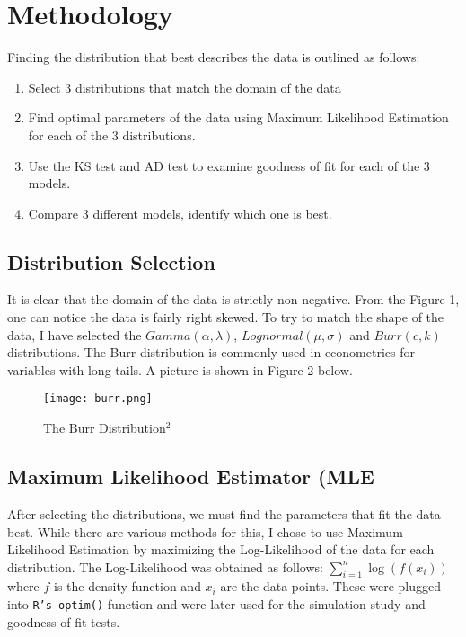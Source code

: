 \documentclass[letterpaper,12pt]{article}
\begin{document}
\section{Methodology}
Finding the distribution that best describes the data is outlined as follows:
\begin{enumerate}
    \item Select 3 distributions that match the domain of the data
    \item Find optimal parameters of the data using Maximum Likelihood Estimation for each of the 3 distributions. 
    \item Use the KS test and AD test to examine goodness of fit for each of the 3 models. 
    \item Compare 3 different models, identify which one is best. 
\end{enumerate}
\subsection{Distribution Selection}

It is clear that the domain of the data is strictly non-negative. From the Figure 1, one can notice the data is fairly right skewed. To try to match the shape of the data, I have selected the $Gamma(\alpha, \lambda)$, $Lognormal(\mu,\sigma)$ and $Burr(c,k)$ distributions. The Burr distribution is commonly used in econometrics for variables with long tails. A picture is shown in Figure 2 below.

\begin{figure}[H]
    \centering
    \caption{The Burr Distribution$^2$}
    \texttt{[image: burr.png]}
\end{figure}
\newpage

\subsection{Maximum Likelihood Estimator (MLE}
After selecting the distributions, we must find the parameters that fit the data best. While there are various methods for this, I chose to use Maximum Likelihood Estimation by maximizing the Log-Likelihood of the data for each distribution. The Log-Likelihood was obtained as follows: $\sum_{i=1}^n\log(f(x_i))$ where $f$ is the density function and $x_i$ are the data points. These were plugged into \texttt{R's optim()} function and were later used for the simulation study and goodness of fit tests. 
\end{document}
